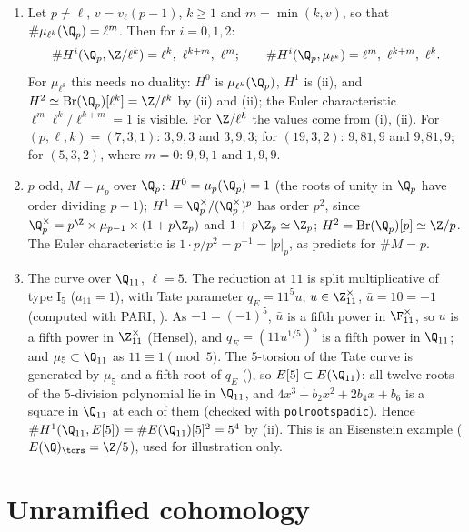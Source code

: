 \begin{example}\label{ex:galcoh:local-orders}
\begin{enumerate}[label=(\alph*)]
\item Let $p\ne\ell$, $v=v_\ell(p-1)$, $k\ge1$ and $m=\min(k,v)$, so that $\#\mu_{\ell^k}(\Q_p)=\ell^m$. Then for $i=0,1,2$:
\[
\#H^i(\Q_p,\Z/\ell^k)=\ell^k,\ \ell^{k+m},\ \ell^m;\qquad\#H^i(\Q_p,\mu_{\ell^k})=\ell^m,\ \ell^{k+m},\ \ell^k .
\]
For $\mu_{\ell^k}$ this needs no duality: $H^0$ is $\mu_{\ell^k}(\Q_p)$, $H^1$ is (ii), and $H^2\simeq\operatorname{Br}(\Q_p)[\ell^k]=\Z/\ell^k$ by
(ii) and (ii); the Euler characteristic $\ell^m\ell^k/\ell^{k+m}=1$ is visible. For $\Z/\ell^k$ the values come from
(i), (ii). For $(p,\ell,k)=(7,3,1)$: $3,9,3$ and $3,9,3$; for $(19,3,2)$: $9,81,9$ and $9,81,9$; for $(5,3,2)$, where $m=0$:
$9,9,1$ and $1,9,9$.
\item $p$ odd, $M=\mu_p$ over $\Q_p$: $H^0=\mu_p(\Q_p)=1$ (the roots of unity in $\Q_p$ have order dividing $p-1$); $H^1=\Q_p^\times/(\Q_p^\times)^p$ has order $p^2$,
since $\Q_p^\times=p^{\Z}\times\mu_{p-1}\times(1+p\Z_p)$ and $1+p\Z_p\simeq\Z_p$; $H^2=\operatorname{Br}(\Q_p)[p]\simeq\Z/p$. The Euler characteristic is $1\cdot p/p^2=p^{-1}=|p|_p$, as
 predicts for $\#M=p$.
\item The curve  over $\Q_{11}$, $\ell=5$. The reduction at $11$ is split multiplicative of type $\mathrm I_5$ ($a_{11}=1$), with Tate parameter
$q_E=11^5u$, $u\in\Z_{11}^\times$, $\bar u=10=-1$ (computed with PARI, ). As $-1=(-1)^5$, $\bar u$ is a fifth power in $\F_{11}^\times$,
so $u$ is a fifth power in $\Z_{11}^\times$ (Hensel), and $q_E=(11u^{1/5})^5$ is a fifth power in $\Q_{11}$; and $\mu_5\subset\Q_{11}$ as $11\equiv1\pmod5$. The
$5$-torsion of the Tate curve is generated by $\mu_5$ and a fifth root of $q_E$ (), so $E[5]\subset E(\Q_{11})$: all twelve roots of the
$5$-division polynomial lie in $\Q_{11}$, and $4x^3+b_2x^2+2b_4x+b_6$ is a square in $\Q_{11}$ at each of them (checked with \texttt{polrootspadic}). Hence
$\#H^1(\Q_{11},E[5])=\#E(\Q_{11})[5]^2=5^4$ by (ii). This is an Eisenstein example ($E(\Q)_{\tors}=\Z/5$), used for illustration
only.
\end{enumerate}
\end{example}
\section{Unramified cohomology}\label{sec:galcoh:unramified}

